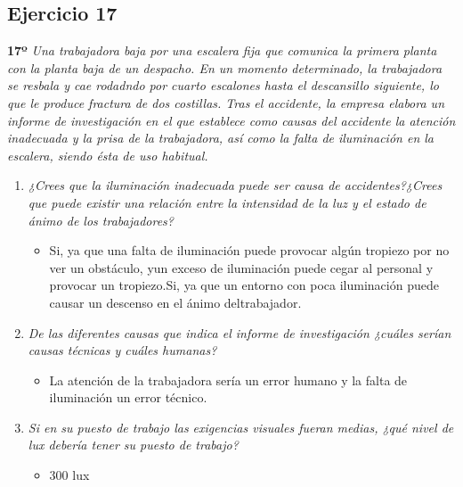 \documentclass{article}
\begin{document}
      \subsection{Ejercicio 17}

        \textbf{17º} \textit{Una trabajadora baja por una escalera fija que comunica la primera planta con la planta baja de un despacho. En un momento determinado, 
        la trabajadora se resbala y cae rodadndo por cuarto escalones hasta el descansillo siguiente, lo que le produce fractura de dos costillas. 
        Tras el accidente, la empresa elabora un informe de investigación en el que establece como causas del accidente la atención inadecuada y la prisa 
        de la trabajadora, así como la falta de iluminación en la escalera, siendo ésta de uso habitual.}

        \begin{enumerate}[label=(\alph*)]
          \item \textit{¿Crees que la iluminación inadecuada puede ser causa de accidentes?¿Crees que puede existir una relación entre la intensidad 
          de la luz y el estado de ánimo de los trabajadores?}
            \begin{itemize}
              \item Si, ya que una falta de iluminación puede provocar algún tropiezo por no ver un obstáculo, yun exceso de iluminación puede cegar 
              al personal y provocar un tropiezo.Si, ya que un entorno con poca iluminación puede causar un descenso en el ánimo deltrabajador.
            \end{itemize}
          \item \textit{De las diferentes causas que indica el informe de investigación ¿cuáles serían causas técnicas y cuáles humanas?}
            \begin{itemize}
              \item La atención de la trabajadora sería un error humano y la falta de iluminación un error técnico.
            \end{itemize}
          \item \textit{Si en su puesto de trabajo las exigencias visuales fueran medias, ¿qué nivel de lux debería tener su puesto de trabajo?}
            \begin{itemize}
              \item 300 lux
            \end{itemize}
        \end{enumerate}
\end{document}
